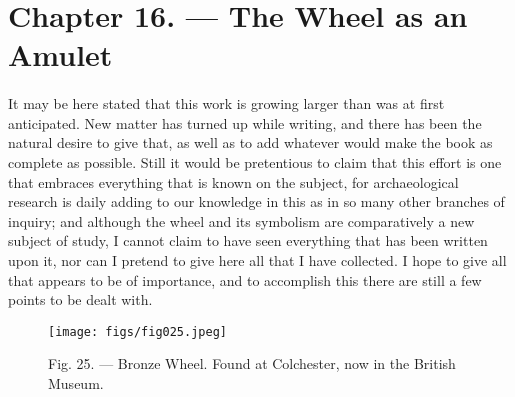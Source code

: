 \documentclass[a4paper, 11pt, oneside, polutonikogreek, english]{article}
\begin{document}
\section{Chapter 16. --- The Wheel as an Amulet}
\paragraph{}
It may be here stated that this work is growing larger than was at first anticipated. New matter has turned up while writing, and there has been the natural desire to give that, as well as to add whatever would make the book as complete as possible. Still it would be pretentious to claim that this effort is one that embraces everything that is known on the subject, for archaeological research is daily adding to our knowledge in this as in so many other branches of inquiry; and although the wheel and its symbolism are comparatively a new subject of study, I cannot claim to have seen everything that has been written upon it, nor can I pretend to give here all that I have collected. I hope to give all that appears to be of importance, and to accomplish this there are still a few points to be dealt with.

\begin{figure}[H]
\centering
\texttt{[image: figs/fig025.jpeg]}
\caption[Fig. 25. --- Bronze Wheel.]{Fig. 25. --- Bronze Wheel. Found at Colchester, now in the British Museum.}
\end{figure}
\end{document}
